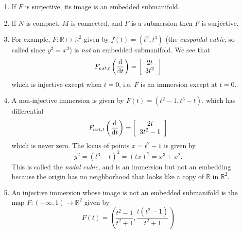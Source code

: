 \begin{enumerate}
  \item{
    If $F$ is surjective, its image is an embedded submanifold.
  }
  \item{
    If $N$ is compact, $M$ is connected, and $F$ is a submersion then
    $F$ is surjective.
  }
  \item{
    For example, $F: \mathbb{R} \mapsto \mathbb{R}^2$ given by
    $f(t) = (t^2, t^3)$ (the \emph{cuspoidal cubic}, so called since
    $y^2 = x^3$) is \emph{not} an embedded submanifold. We see that
    $$
      F_{ast, t}
        \left(
          \frac{\mathop{}\!\mathrm{d}}{\mathop{}\!\mathrm{d} t}
        \right)
    = \left[
        \begin{array}{c}
          2t \\ 3t^2
        \end{array}
      \right]
    $$
    which is injective except when $t = 0$, i.e. $F$ is an immersion
    except at $t = 0$.
  }
  \item{
    A non-injective immersion is given by
    $F(t) = (t^2 - 1, t^3 - t)$, which has differential
    $$
      F_{ast, t}
        \left(
          \frac{\mathop{}\!\mathrm{d}}{\mathop{}\!\mathrm{d} t}
        \right)
    = \left[
        \begin{array}{c}
          2t \\ 3t^2 - 1
        \end{array}
      \right]
    $$
    which is never zero. The locus of points
    $x = t^2 - 1$ is given by
    $$
      y^2
    = (t^3 - t)^2
    = (tx)^2
    = x^3 + x^2.
    $$
    This is called the \emph{nodal cubic}, and is an immersion but not
    an embedding because the origin has no neighborhood that looks
    like a copy of $\mathbb{R}$ in $\mathbb{R}^2$.
  }
  \item{
    An injective immersion whose image is not an embedded submanifold
    is the map $F: (-\infty, 1) \to \mathbb{R}^2$ given by
    $$
      F(t)
    = \left(
        \frac{t^2 - 1}{t^2 + 1},
        \frac{t(t^2 - 1)}{t^2 + 1}
      \right)
    $$
  }
\end{enumerate}
